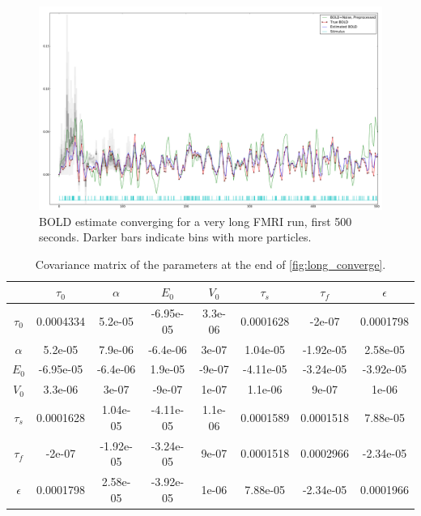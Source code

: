 \begin{figure}
\centering
\includegraphics[clip=true,trim=1cm 0cm 0cm 0cm, width=17cm]{images/long_converge_500}
\caption{BOLD estimate converging for a very long FMRI run, first 500 seconds. Darker bars
indicate bins with more particles.}
\label{fig:long_converge_500}
\end{figure}

\begin{table}[t]
\begin{tabular}{|c | c  c  c  c  c  c  c |}
\hline
  & $\tau_0$ & $\alpha$ & $E_0$    & $V_0$    & $\tau_s$ & $\tau_f$ & $\epsilon$ \\
\hline
\rowcolor[gray]{.8} $\tau_0$  & 0.0004334 & 5.2e-05 & -6.95e-05 & 3.3e-06 & 0.0001628 & -2e-07 & 0.0001798 \\
$\alpha$                      & 5.2e-05 & 7.9e-06 & -6.4e-06 & 3e-07 & 1.04e-05 & -1.92e-05 & 2.58e-05 \\
\rowcolor[gray]{.8} $E_0$     & -6.95e-05 & -6.4e-06 & 1.9e-05 & -9e-07 & -4.11e-05 & -3.24e-05 & -3.92e-05 \\
$V_0$                         & 3.3e-06 & 3e-07 & -9e-07 & 1e-07 & 1.1e-06 & 9e-07 & 1e-06 \\
\rowcolor[gray]{.8} $\tau_s$  & 0.0001628 & 1.04e-05 & -4.11e-05 & 1.1e-06 & 0.0001589 & 0.0001518 & 7.88e-05 \\
$\tau_f$                      & -2e-07 & -1.92e-05 & -3.24e-05 & 9e-07 & 0.0001518 & 0.0002966 & -2.34e-05 \\
\rowcolor[gray]{.8} $\epsilon$& 0.0001798 & 2.58e-05 & -3.92e-05 & 1e-06 & 7.88e-05 & -2.34e-05 & 0.0001966 \\
\hline
\end{tabular}
\caption{Covariance matrix of the parameters at the end of \autoref{fig:long_converge}.}
\label{tab:long_cov}
\end{table}

